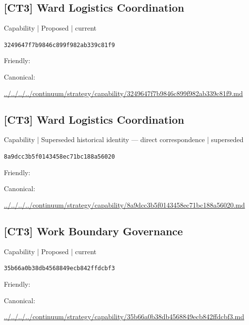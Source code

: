 \documentclass[10pt,a4paper]{article}
\begin{document}
\subsection*{[CT3] Ward Logistics Coordination}
{\small Capability | Proposed | current}\par
\texttt{3249647f7b9846c899f982ab339c81f9}\par
Friendly: \par
Canonical: \par
{\footnotesize\url{../../../../continuum/strategy/capability/3249647f7b9846c899f982ab339c81f9.md}}\par
\subsection*{[CT3] Ward Logistics Coordination}
{\small Capability | Superseded historical identity — direct correspondence | superseded}\par
\texttt{8a9dcc3b5f0143458ec71bc188a56020}\par
Friendly: \par
Canonical: \par
{\footnotesize\url{../../../../continuum/strategy/capability/8a9dcc3b5f0143458ec71bc188a56020.md}}\par
\subsection*{[CT3] Work Boundary Governance}
{\small Capability | Proposed | current}\par
\texttt{35b66a0b38db4568849ecb842ffdcbf3}\par
Friendly: \par
Canonical: \par
{\footnotesize\url{../../../../continuum/strategy/capability/35b66a0b38db4568849ecb842ffdcbf3.md}}\par
\end{document}

